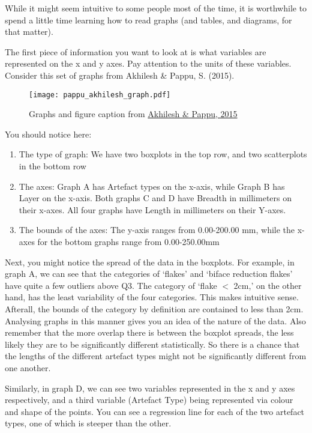 \documentclass{article}
\begin{document}
While it might seem intuitive to some people most of the time, it is worthwhile to spend a little time learning how to read graphs (and tables, and diagrams, for that matter). 

The first piece of information you want to look at is what variables are represented on the x and y axes. Pay attention to the units of these variables. 
\newpage
Consider this set of graphs from Akhilesh \& Pappu, S. (2015).

\begin{figure}[hbt!]
    \texttt{[image: pappu\_akhilesh\_graph.pdf]}
    \caption{Graphs and figure caption from \protect\hyperlink{pappu}{Akhilesh \& Pappu, 2015}}
    \label{fig:pappu-graph}
\end{figure}

You should notice here:

\begin{enumerate}
    \item The type of graph: We have two boxplots in the top row, and two scatterplots in the bottom row
    \item The axes: Graph A has Artefact types on the x-axis, while Graph B has Layer on the x-axis. Both graphs C and D have Breadth in millimeters on their x-axes. All four graphs have Length in millimeters on their Y-axes.
    \item The bounds of the axes: The y-axis ranges from 0.00-200.00 mm, while the x-axes for the bottom graphs range from 0.00-250.00mm
\end{enumerate}

Next, you might notice the spread of the data in the boxplots. For example, in graph A, we can see that the categories of ‘flakes’ and ‘biface reduction flakes’ have quite a few outliers above Q3. The category of ‘flake $<$ 2cm,’ on the other hand, has the least variability of the four categories. This makes intuitive sense. Afterall, the bounds of the category by definition are contained to less than 2cm. Analysing graphs in this manner gives you an idea of the nature of the data. Also remember that the more overlap there is between the boxplot spreads, the less likely they are to be significantly different statistically. So there is a chance that the lengths of the different artefact types might not be significantly different from one another. 

Similarly, in graph D, we can see two variables represented in the x and y axes respectively, and a third variable (Artefact Type) being represented via colour and shape of the points. You can see a regression line for each of the two artefact types, one of which is steeper than the other. 
\end{document}
